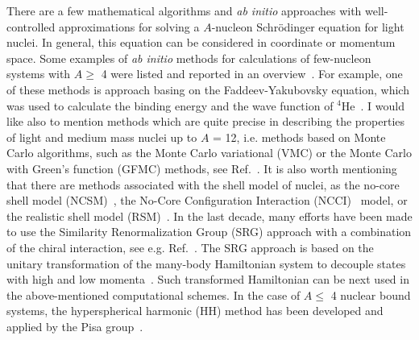 There are a few mathematical algorithms and \textit{ab initio} approaches with well-controlled approximations for solving a $A$-nucleon Schr\"odinger equation for light nuclei. In general, this equation can be considered in coordinate or momentum space. Some examples of \textit{ab initio} methods for calculations of few-nucleon systems with $A \geq$ 4 were listed and reported in an overview~\cite{leidemann2013modern}. For example, one of these methods is approach basing on the Faddeev-Yakubovsky equation, which was used to calculate the binding energy and the wave function of $^{4}$He~\cite{nogga2000modern}. I would like also to mention methods which are quite precise in describing the properties of light and medium mass nuclei up to $A$ = 12, i.e. methods based on Monte Carlo algorithms, such as the Monte Carlo variational (VMC) or the Monte Carlo with Green's function (GFMC) methods, see Ref.~\cite{carlson2015quantum}. It is also worth mentioning that there are methods associated with the shell model of nuclei, as the no-core shell model (NCSM)~\cite{navratil2016unified}, the No-Core Configuration Interaction (NCCI)~\cite{maris2015emergence} model, or the realistic shell model (RSM)~\cite{fukui2018realistic}. In the last decade, many efforts have been made to use the Similarity Renormalization Group (SRG) approach with a combination of the chiral interaction, see e.g. Ref.~\cite{epelbaum2019few}. The SRG approach is based on the unitary transformation of the many-body Hamiltonian system to decouple states with high and low momenta~\cite{bogner2010low, hergert2016medium}. Such transformed Hamiltonian can be next used in the above-mentioned computational schemes.
In the case of $A \leq$ 4 nuclear bound systems, the hyperspherical harmonic (HH) method has been developed and applied by the Pisa group~\cite{kievsky2008high}.

